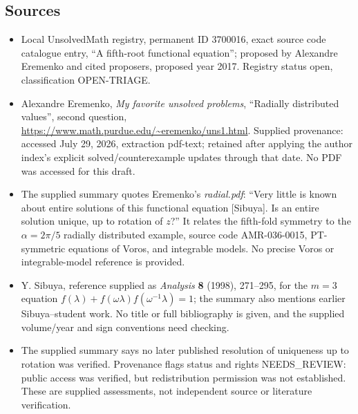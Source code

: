 \documentclass[11pt]{article}
\begin{document}
\subsection{Sources}
\begin{itemize}
\item Local UnsolvedMath registry, permanent ID 3700016, exact source code catalogue entry, ``A fifth-root functional equation''; proposed by Alexandre Eremenko and cited proposers, proposed year 2017. Registry status open, classification OPEN-TRIAGE.
\item Alexandre Eremenko, \emph{My favorite unsolved problems}, ``Radially distributed values'', second question, \url{https://www.math.purdue.edu/~eremenko/uns1.html}. Supplied provenance: accessed July 29, 2026, extraction pdf-text; retained after applying the author index's explicit solved/counterexample updates through that date. No PDF was accessed for this draft.
\item The supplied summary quotes Eremenko's \emph{radial.pdf}: ``Very little is known about entire solutions of this functional equation [Sibuya]. Is an entire solution unique, up to rotation of $z$?'' It relates the fifth-fold symmetry to the $\alpha=2\pi/5$ radially distributed example, source code AMR-036-0015, PT-symmetric equations of Voros, and integrable models. No precise Voros or integrable-model reference is provided.
\item Y. Sibuya, reference supplied as \emph{Analysis} \textbf{8} (1998), 271--295, for the $m=3$ equation $f(\lambda)+f(\omega\lambda)f(\omega^{-1}\lambda)=1$; the summary also mentions earlier Sibuya--student work. No title or full bibliography is given, and the supplied volume/year and sign conventions need checking.
\item The supplied summary says no later published resolution of uniqueness up to rotation was verified. Provenance flags status and rights NEEDS\_REVIEW: public access was verified, but redistribution permission was not established. These are supplied assessments, not independent source or literature verification.
\end{itemize}
\end{document}
